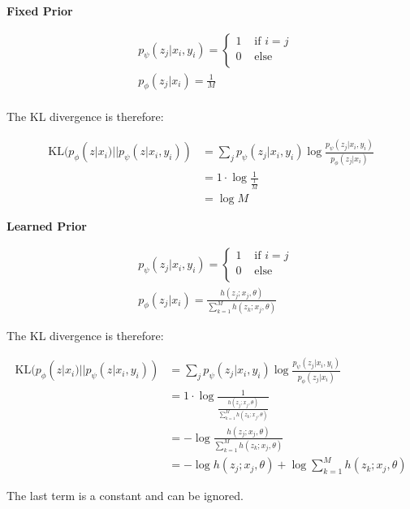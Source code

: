 \documentclass{article}
\begin{document}
\textbf{Fixed Prior}

\begin{align}
  &p_\psi(z_j | x_i, y_i) =
  \begin{cases}
    1 & \mbox{ if } i = j \\
    0 & \mbox{ else } \\
  \end{cases} \\
  &p_\phi(z_j | x_i) = \frac{1}{M}
  \\
\end{align}

The KL divergence is therefore:

\begin{align}
\mbox{KL}(p_\phi(z | x_i) || p_\psi(z | x_i, y_i)) &= \sum_j p_\psi(z_j | x_i, y_i) \log \frac{p_\psi(z_j | x_i, y_i)}{p_\phi(z_j | x_i)} \\
&= 1 \cdot \log \frac{1}{\frac{1}{M}} \\
&= \log M
\end{align}

\textbf{Learned Prior}

\begin{align}
  &p_\psi(z_j | x_i, y_i) =
  \begin{cases}
    1 & \mbox{ if } i = j \\
    0 & \mbox{ else } \\
  \end{cases} \\
  &p_\phi(z_j | x_i) = \frac{h(z_j; x_j, \theta)}{\sum_{k=1}^M h(z_k; x_j, \theta)}
\end{align}

The KL divergence is therefore:

\begin{align}
\mbox{KL}(p_\phi(z | x_i) || p_\psi(z | x_i, y_i)) &= \sum_j p_\psi(z_j | x_i, y_i) \log \frac{p_\psi(z_j | x_i, y_i)}{p_\phi(z_j | x_i)} \\
&= 1 \cdot \log \frac{1}{\frac{h(z_j; x_j, \theta)}{\sum_{k=1}^M h(z_k; x_j, \theta)}} \\
&= - \log \frac{h(z_j; x_j, \theta)}{\sum_{k=1}^M h(z_k; x_j, \theta)} \\
&= - \log h(z_j; x_j, \theta) + \log \sum_{k=1}^M h(z_k; x_j, \theta)
\end{align}

The last term is a constant and can be ignored.

%
\end{document}
